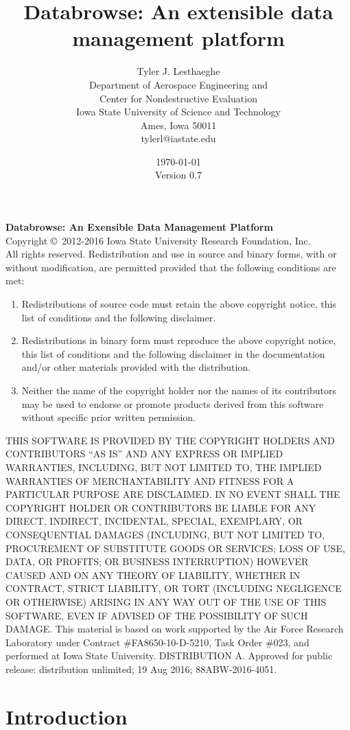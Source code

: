 \documentclass[10pt]{article}
\title{Databrowse: An extensible data management platform}
\author{
        Tyler J. Lesthaeghe \\
                Department of Aerospace Engineering and\\
                Center for Nondestructive Evaluation\\
        Iowa State University of Science and Technology\\
        Ames, Iowa 50011\\
        tylerl@iastate.edu
}
\date{\today \\
	Version 0.7}
\begin{document}
\maketitle

\clearpage
\noindent\textbf{Databrowse:  An Exensible Data Management Platform} \\
Copyright \copyright\ 2012-2016 Iowa State University Research Foundation, Inc. \\
All rights reserved.
\hfill\break
\hfill\break
Redistribution and use in source and binary forms, with or without modification, are permitted provided that the following conditions are met:
\begin{enumerate}
\item Redistributions of source code must retain the above copyright notice, this list of conditions and the following disclaimer.
\item Redistributions in binary form must reproduce the above copyright notice, this list of conditions and the following disclaimer in the documentation and/or other materials provided with the distribution.
\item Neither the name of the copyright holder nor the names of its contributors may be used to endorse or promote products derived from this software without specific prior written permission.
\end{enumerate}
THIS SOFTWARE IS PROVIDED BY THE COPYRIGHT HOLDERS AND CONTRIBUTORS ``AS IS'' AND ANY EXPRESS OR IMPLIED WARRANTIES, INCLUDING, BUT NOT LIMITED TO, THE IMPLIED WARRANTIES OF MERCHANTABILITY AND FITNESS FOR A PARTICULAR PURPOSE ARE DISCLAIMED. IN NO EVENT SHALL THE COPYRIGHT HOLDER OR CONTRIBUTORS BE LIABLE FOR ANY DIRECT, INDIRECT, INCIDENTAL, SPECIAL, EXEMPLARY, OR CONSEQUENTIAL DAMAGES (INCLUDING, BUT NOT LIMITED TO, PROCUREMENT OF SUBSTITUTE GOODS OR SERVICES; LOSS OF USE, DATA, OR PROFITS; OR BUSINESS INTERRUPTION) HOWEVER CAUSED AND ON ANY THEORY OF LIABILITY, WHETHER IN CONTRACT, STRICT LIABILITY, OR TORT (INCLUDING NEGLIGENCE OR OTHERWISE) ARISING IN ANY WAY OUT OF THE USE OF THIS SOFTWARE, EVEN IF ADVISED OF THE POSSIBILITY OF SUCH DAMAGE.
\hfill\break
\hfill\break
This material is based on work supported by the Air Force Research Laboratory under Contract \#FA8650-10-D-5210, Task Order \#023, and performed at Iowa State University.
\hfill\break
\hfill\break
DISTRIBUTION A.  Approved for public release:  distribution unlimited; 19 Aug 2016; 88ABW-2016-4051.
\clearpage
\tableofcontents

\clearpage
\section{Introduction}
\end{document}

